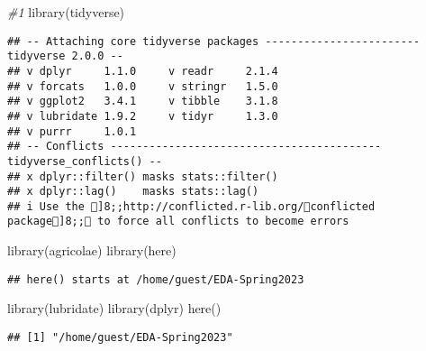 \documentclass[
]{article}
\newenvironment{Shaded}{\begin{snugshade}}{\end{snugshade}}
\newcommand{\CommentTok}[1]{\textcolor[rgb]{0.56,0.35,0.01}{\textit{#1}}}
\newcommand{\FunctionTok}[1]{\textcolor[rgb]{0.00,0.00,0.00}{#1}}
\newcommand{\NormalTok}[1]{#1}
\begin{document}
\begin{Shaded}
\begin{Highlighting}[]
\CommentTok{\#1}
\FunctionTok{library}\NormalTok{(tidyverse)}
\end{Highlighting}
\end{Shaded}

\begin{verbatim}
## -- Attaching core tidyverse packages ------------------------ tidyverse 2.0.0 --
## v dplyr     1.1.0     v readr     2.1.4
## v forcats   1.0.0     v stringr   1.5.0
## v ggplot2   3.4.1     v tibble    3.1.8
## v lubridate 1.9.2     v tidyr     1.3.0
## v purrr     1.0.1     
## -- Conflicts ------------------------------------------ tidyverse_conflicts() --
## x dplyr::filter() masks stats::filter()
## x dplyr::lag()    masks stats::lag()
## i Use the ]8;;http://conflicted.r-lib.org/conflicted package]8;; to force all conflicts to become errors
\end{verbatim}

\begin{Shaded}
\begin{Highlighting}[]
\FunctionTok{library}\NormalTok{(agricolae)   }
\FunctionTok{library}\NormalTok{(here)}
\end{Highlighting}
\end{Shaded}

\begin{verbatim}
## here() starts at /home/guest/EDA-Spring2023
\end{verbatim}

\begin{Shaded}
\begin{Highlighting}[]
\FunctionTok{library}\NormalTok{(lubridate)}
\FunctionTok{library}\NormalTok{(dplyr)}
\FunctionTok{here}\NormalTok{()}
\end{Highlighting}
\end{Shaded}

\begin{verbatim}
## [1] "/home/guest/EDA-Spring2023"
\end{verbatim}
\end{document}
